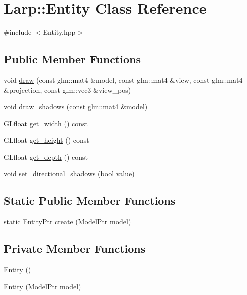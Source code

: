 \hypertarget{classLarp_1_1Entity}{}\section{Larp\+:\+:Entity Class Reference}
\label{classLarp_1_1Entity}


{\ttfamily \#include $<$Entity.\+hpp$>$}

\subsection*{Public Member Functions}
\begin{DoxyCompactItemize}
\item 
void \hyperlink{classLarp_1_1Entity_a3c80c16bd8188f4a895826364c7d3695}{draw} (const glm\+::mat4 \&model, const glm\+::mat4 \&view, const glm\+::mat4 \&projection, const glm\+::vec3 \&view\+\_\+pos)
\item 
void \hyperlink{classLarp_1_1Entity_a1c5fe493e9cf895c83447decfbed9dc4}{draw\+\_\+shadows} (const glm\+::mat4 \&model)
\item 
G\+Lfloat \hyperlink{classLarp_1_1Entity_a7f4fee67776ac0f0b1fa8d499cafe46e}{get\+\_\+width} () const 
\item 
G\+Lfloat \hyperlink{classLarp_1_1Entity_a26ae62c497eb781a8bf3f9235c8516f4}{get\+\_\+height} () const 
\item 
G\+Lfloat \hyperlink{classLarp_1_1Entity_af0a2bd06ec666ce59bba9db6da7f87a8}{get\+\_\+depth} () const 
\item 
void \hyperlink{classLarp_1_1Entity_a8a4baeb0ef80f36479a9171cdeee9a81}{set\+\_\+directional\+\_\+shadows} (bool value)
\end{DoxyCompactItemize}
\subsection*{Static Public Member Functions}
\begin{DoxyCompactItemize}
\item 
static \hyperlink{namespaceLarp_a775efcc4cabb308d50168c52df343353}{Entity\+Ptr} \hyperlink{classLarp_1_1Entity_a2a7a0d567789fafeb63c83ed1002a32a}{create} (\hyperlink{namespaceLarp_a1fbc1dec59f7a571dc06e152b1e7d38c}{Model\+Ptr} model)
\end{DoxyCompactItemize}
\subsection*{Private Member Functions}
\begin{DoxyCompactItemize}
\item 
\hyperlink{classLarp_1_1Entity_ad4b4badc7c5cb0fc6b3f2dc3525060e8}{Entity} ()
\item 
\hyperlink{classLarp_1_1Entity_a5ca366a3278d83d90e46eaa373ea2f39}{Entity} (\hyperlink{namespaceLarp_a1fbc1dec59f7a571dc06e152b1e7d38c}{Model\+Ptr} model)
\end{DoxyCompactItemize}
